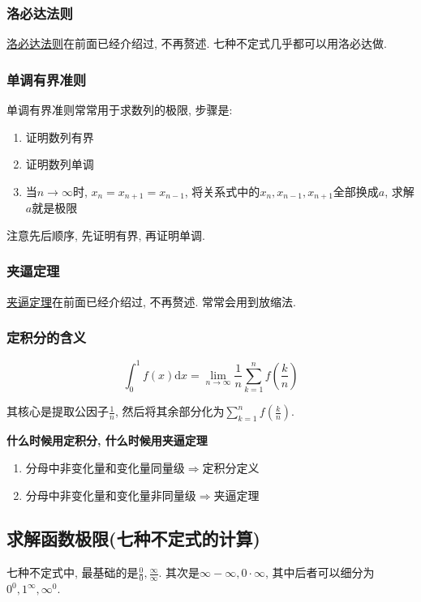 \subsubsection{洛必达法则}
\hyperref[洛必达法则]{洛必达法则}在前面已经介绍过, 不再赘述. 七种不定式几乎都可以用洛必达做.
\subsubsection{单调有界准则}\label{单调有界准则算极限}
单调有界准则常常用于求数列的极限, 步骤是:
\begin{enumerate}
\item 证明数列有界
\item 证明数列单调
\item 当$ n\rightarrow \infty $时, $ x_{n}=x_{n+1}=x_{n-1} $, 将关系式中的$ x_{n}, x_{n-1}, x_{n+1} $全部换成$ a $, 求解$ a $就是极限
\end{enumerate}\par
注意先后顺序, 先证明有界, 再证明单调.
\subsubsection{夹逼定理}
\hyperref[夹逼定理]{夹逼定理}在前面已经介绍过, 不再赘述. 常常会用到放缩法.
\subsubsection{定积分的含义}
\begin{equation*}
\int_{0}^{1}f(x)\mathrm{d}x=\lim\limits_{n \rightarrow \infty}\frac{1}{n}\sum_{k=1}^{n}f(\frac{k}{n})
\end{equation*}\par
其核心是提取公因子$ \frac{1}{n} $, 然后将其余部分化为$ \sum_{k=1}^{n}f(\frac{k}{n}) $.
\begin{tcolorbox}
\textbf{什么时候用定积分, 什么时候用夹逼定理}
\begin{enumerate}
\item 分母中非变化量和变化量同量级$ \Rightarrow $定积分定义
\item 分母中非变化量和变化量非同量级$ \Rightarrow $夹逼定理
\end{enumerate}
\end{tcolorbox}
\subsection{求解函数极限(七种不定式的计算)}
七种不定式中, 最基础的是$ \frac{0}{0}, \frac{\infty}{\infty} $. 其次是$ \infty-\infty, 0\cdot\infty $, 其中后者可以细分为$ 0^{0}, 1^{\infty}, \infty^{0} $.
